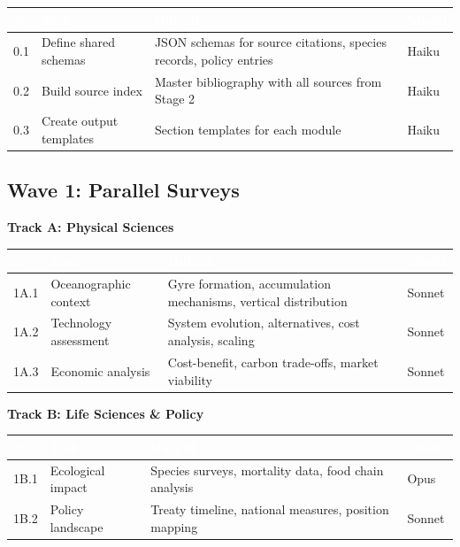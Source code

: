 \documentclass[11pt,letterpaper]{article}
\newcommand{\tableheader}[1]{\textbf{\sffamily\textcolor{white}{#1}}}
\begin{document}
\begin{center}
\begin{tabularx}{\textwidth}{C{0.6cm}L{3cm}XC{1.5cm}}
\toprule
{}
\tableheader{\#} & \tableheader{Task} & \tableheader{Output} & \tableheader{Model} \\
 & Define shared schemas & JSON schemas for source citations, species records, policy entries & Haiku \\
0.2 & Build source index & Master bibliography with all sources from Stage 2 & Haiku \\
0.3 & Create output templates & Section templates for each module & Haiku \\
\bottomrule
\end{tabularx}
\end{center}

\subsection{Wave 1: Parallel Surveys}

\textbf{Track A: Physical Sciences}

\begin{center}
\begin{tabularx}{\textwidth}{C{0.6cm}L{3cm}XC{1.5cm}}
\toprule
{}
\tableheader{\#} & \tableheader{Task} & \tableheader{Output} & \tableheader{Model} \\
\midrule
1A.1 & Oceanographic context & Gyre formation, accumulation mechanisms, vertical distribution & Sonnet \\
1A.2 & Technology assessment & System evolution, alternatives, cost analysis, scaling & Sonnet \\
1A.3 & Economic analysis & Cost-benefit, carbon trade-offs, market viability & Sonnet \\
\bottomrule
\end{tabularx}
\end{center}

\textbf{Track B: Life Sciences \& Policy}

\begin{center}
\begin{tabularx}{\textwidth}{C{0.6cm}L{3cm}XC{1.5cm}}
\toprule
{}
\tableheader{\#} & \tableheader{Task} & \tableheader{Output} & \tableheader{Model} \\
\midrule
1B.1 & Ecological impact & Species surveys, mortality data, food chain analysis & Opus \\
1B.2 & Policy landscape & Treaty timeline, national measures, position mapping & Sonnet \\
\bottomrule
\end{tabularx}
\end{center}
\end{document}
